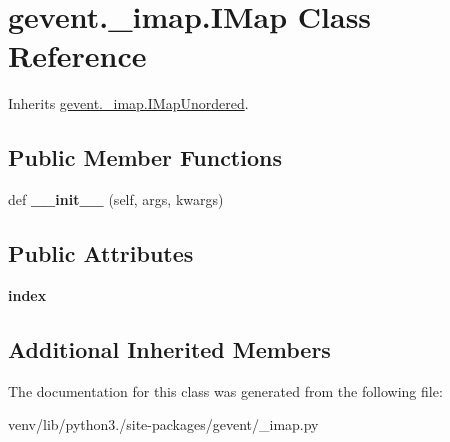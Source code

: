 \hypertarget{classgevent_1_1__imap_1_1_i_map}{}\section{gevent.\+\_\+imap.\+I\+Map Class Reference}
\label{classgevent_1_1__imap_1_1_i_map}


Inherits \hyperlink{classgevent_1_1__imap_1_1_i_map_unordered}{gevent.\+\_\+imap.\+I\+Map\+Unordered}.

\subsection*{Public Member Functions}
\begin{DoxyCompactItemize}
\item 
\mbox{\label{classgevent_1_1__imap_1_1_i_map_a239b6cfde01fbc5d238f37ef812cc2cc}} 
def {\bfseries \+\_\+\+\_\+init\+\_\+\+\_\+} (self, args, kwargs)
\end{DoxyCompactItemize}
\subsection*{Public Attributes}
\begin{DoxyCompactItemize}
\item 
\mbox{\label{classgevent_1_1__imap_1_1_i_map_aea6dbc2da2525612c1d1f3fcae7d6313}} 
{\bfseries index}
\end{DoxyCompactItemize}
\subsection*{Additional Inherited Members}


The documentation for this class was generated from the following file\+:\begin{DoxyCompactItemize}
\item 
venv/lib/python3./site-\/packages/gevent/\+\_\+imap.\+py\end{DoxyCompactItemize}
